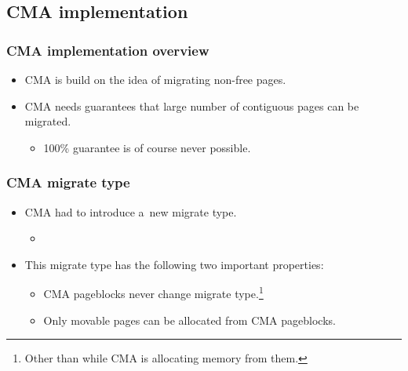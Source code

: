 
\subsection{CMA implementation}

\begin{frame}
  \frametitle{CMA implementation overview}

  \begin{itemize}
  \item CMA is build on the idea of migrating non-free pages.
  \item CMA needs guarantees that large number of contiguous pages can
    be migrated.
    \begin{itemize}
    \item 100\% guarantee is of course never possible.
    \end{itemize}
  \end{itemize}
\end{frame}

\begin{frame}[fragile]
  \frametitle{CMA migrate type}

  \begin{itemize}
  \item CMA had to introduce a~new migrate type.
    \begin{itemize}
    \item {}
    \end{itemize}
  \item This migrate type has the following two important properties:
    \begin{itemize}
    \item CMA pageblocks never change migrate type.\footnote{Other
      than while CMA is allocating memory from them.}
    \item Only movable pages can be allocated from CMA pageblocks.
    \end{itemize}
  \end{itemize}
\end{frame}

